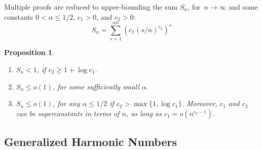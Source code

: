 \documentclass{beamer}
\newtheorem{proposition}{Proposition}
\newcommand{\autotitle}{\secname\ifdefempty{\subsecname}{}{~--- \subsecname}}
\begin{document}
\begin{frame}{\autotitle}
    Multiple proofs are reduced to upper-bounding the sum $S_n$,
    for~$n\to\infty$ and some constants $0<\alpha\leq 1/2$, $c_1>0$, and $c_2>0$:
    \begin{equation*}
        S_n=\sum_{s=1}^{\alpha n}{\left(c_1(s/n)^{c_2}\right)^s}
    \end{equation*}
    
    \begin{proposition}
        \begin{enumerate}
            \item $S_n<1$, if $c_2\geq1+\log c_1$.
            \item $S_n\leq o(1)$, for some sufficiently small $\alpha$.
            \item $S_n\leq o(1)$, for any $\alpha\leq 1/2$ if $c_2>\max\{1,\log c_1\}$.
            Moreover, $c_1$ and $c_2$ can be superconstants in terms of $n$,
            as long as $c_1=o\left(n^{c_2-1}\right)$.
        \end{enumerate}
    \end{proposition}
\end{frame}

\subsection{Generalized Harmonic Numbers}
\end{document}
